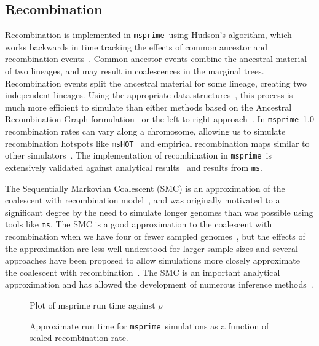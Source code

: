 \documentclass{article}
\newcommand{\msprime}[0]{\texttt{msprime}}
\newcommand{\ms}[0]{\texttt{ms}}
\begin{document}
\subsection*{Recombination}

Recombination is implemented in \msprime\ using Hudson's algorithm, which
works backwards in time tracking the
effects of common ancestor and recombination
events~\citep{hudson1983properties,hudson1990gene,kelleher2016efficient}.
Common ancestor events combine the ancestral material of two lineages, and may
result in coalescences in the marginal trees. Recombination events
split the ancestral material for some lineage, creating two independent
lineages. Using the appropriate data structures~\citep{kelleher2016efficient},
this process is much more efficient to simulate than either
methods based on the Ancestral Recombination Graph
formulation~\citep{griffiths1991two,griffiths1997ancestral}
or the left-to-right approach~\citep{wiuf1999recombination,wiuf1999ancestry}.
In \msprime\ 1.0 recombination rates can vary along a chromosome, allowing
us to simulate recombination hotspots like \texttt{msHOT}~\citep{hellenthal2007mshot}
and empirical recombination maps similar to other
simulators~\citep[e.g.][]{shlyakhter2014cosi2}.
The implementation of recombination in \msprime\ is extensively validated
against analytical results~\citep{hudson1983properties,kaplan1985use}
and results from \ms.

The Sequentially Markovian Coalescent (SMC) is an approximation of the
coalescent with recombination
model~\citep{mcvean2005approximating,marjoram2006fast},
and was originally motivated to a significant degree by the need to
simulate longer genomes than was possible using tools like \ms.
The SMC is a good approximation to the
coalescent with recombination when we have four or fewer sampled
genomes~\citep{hobolth2014markovian,wilton2015smc}, but the
effects of the approximation are less well understood for larger
sample sizes and several approaches have been proposed to
allow simulations more closely approximate the coalescent
with recombination~\citep{chen2009fast,wang2014new,staab2015scrm}.
The SMC is an important analytical approximation
and has allowed the development of numerous inference
methods~\citep{
li2011inference,
harris2013inferring,
sheehan2013estimating,
schiffels2014inferring,
carmi2014renewal,
rasmussen2014genome,
zheng2014bayesian,
terhorst2017robust}.

\begin{figure}
\Large{Plot of msprime run time against $\rho$}
\caption{\label{fig-recombination-perf} Approximate run time for \msprime\
simulations as a function of scaled recombination rate.
}
\end{figure}
\end{document}
